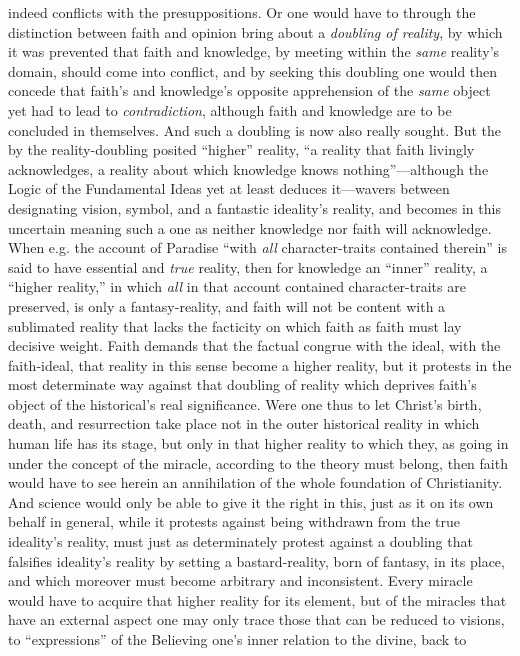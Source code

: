 \documentclass[12pt,a4paper]{book}
\begin{document}
indeed conflicts with the presuppositions. Or one would have to through the distinction between faith and opinion bring
about a \emph{doubling of reality}, by which it was prevented that faith and knowledge, by meeting within the \emph{same}
reality's domain, should come into conflict, and by seeking this doubling one would then concede that faith's and
knowledge's opposite apprehension of the \emph{same} object yet had to lead to \emph{contradiction}, although faith and knowledge
are to be concluded in themselves. And such a doubling is now also really sought. But the by the reality-doubling posited
``higher'' reality, ``a reality that faith livingly acknowledges, a reality about which knowledge knows nothing''---although
the Logic of the Fundamental Ideas yet at least deduces it---wavers between designating vision, symbol, and a fantastic
ideality's reality, and becomes in this uncertain meaning such a one as neither knowledge nor faith will acknowledge. When
e.g. the account of Paradise ``with \emph{all} character-traits contained therein'' is said to have essential and \emph{true} reality,
then for knowledge an ``inner'' reality, a ``higher reality,'' in which \emph{all} in that account contained character-traits are
preserved, is only a fantasy-reality, and faith will not be content with a sublimated reality that lacks the facticity on
which faith as faith must lay decisive weight. Faith demands that the factual congrue with the ideal, with the faith-ideal,
that reality in this sense become a higher reality, but it protests in the most determinate way against that doubling of
reality which deprives faith's object of the historical's real significance. Were one thus to let Christ's birth, death,
and resurrection take place not in the outer historical reality in which human life has its stage, but only in that higher
reality to which they, as going in under the concept of the miracle, according to the theory must belong, then faith would
have to see herein an annihilation of the whole foundation of Christianity. And science would only be able to give it the
right in this, just as it on its own behalf in general, while it protests against being withdrawn from the true ideality's
reality, must just as determinately protest against a doubling that falsifies ideality's reality by setting a
bastard-reality, born of fantasy, in its place, and which moreover must become arbitrary and inconsistent. Every miracle
would have to acquire that higher reality for its element, but of the miracles that have an external aspect one may only
trace those that can be reduced to visions, to ``expressions'' of the Believing one's inner relation to the divine, back to
\end{document}
